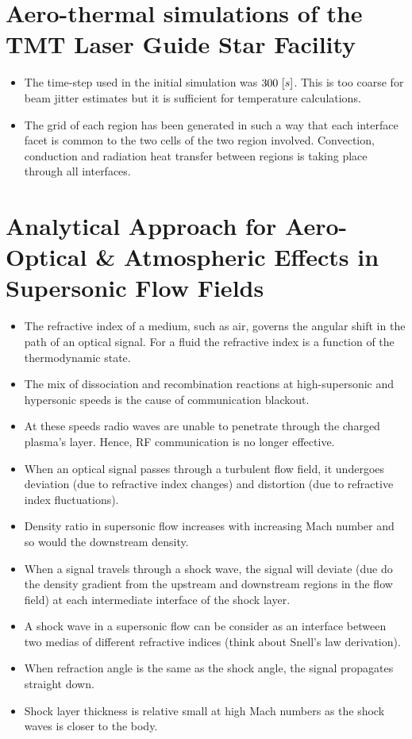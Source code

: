 	\section{Aero-thermal simulations of the TMT Laser Guide Star Facility \cite{vogiatzis:spie:2014}} 
        \begin{itemize}
            \item The time-step used in the initial simulation was $300\,\left[s\right]$. This is too coarse for beam jitter estimates but it is sufficient for temperature calculations.
            \item The grid of each region has been generated in such a way that each interface facet is common to the two cells of the two region involved. Convection, conduction and radiation heat transfer between regions is taking place through all interfaces.
        \end{itemize}
		

    \section{Analytical Approach for Aero-Optical \& Atmospheric Effects in Supersonic Flow Fields \cite{gupta:scitech:2020}} 
        \begin{itemize}
            \item The refractive index of a medium, such as air, governs the angular shift in the path of an optical signal. For a fluid the refractive index is a function of the thermodynamic state. 
            \item The mix of dissociation and recombination reactions at high-supersonic and hypersonic speeds is the cause of communication blackout.
            \item At these speeds radio waves are unable to penetrate through the charged plasma's layer. Hence, RF communication is no longer effective.
            \item When an optical signal passes through a turbulent flow field, it undergoes deviation (due to refractive index changes) and distortion (due to refractive index fluctuations).
            \item Density ratio in supersonic flow increases with increasing Mach number and so would the downstream density. 
            \item When a signal travels through a shock wave, the signal will deviate (due do the density gradient from the upstream and downstream regions in the flow field) at each intermediate interface of the shock layer.  
            \item A shock wave in a supersonic flow can be consider as an interface between two medias of different refractive indices (think about Snell's law derivation). 
            \item When refraction angle is the same as the shock angle, the signal propagates straight down. 
            \item Shock layer thickness is relative small at high Mach numbers as the shock waves is closer to the body. 
        \end{itemize}
		


